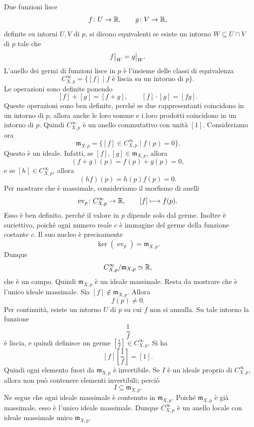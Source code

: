 \documentclass[a4paper]{article}
\begin{document}
\begin{snippetproof}{}
    Due funzioni lisce
    \[
        f\colon U\to\mathbb{R},
        \qquad
        g\colon V\to\mathbb{R},
    \]
    definite su intorni \(U,V\) di \(p\), si dicono equivalenti se esiste un intorno \(W\subseteq U\cap V\) di \(p\) tale che
    \[
        \restr{f}{W}=\restr{g}{W}.
    \]
    L'anello dei germi di funzioni lisce in \(p\) è l'insieme delle classi di equivalenza
    \[
        C^\infty_{X,p}
        =
        \{[f]\mid f \text{ è liscia su un intorno di }p\}.
    \]
    Le operazioni sono definite ponendo
    \[
        [f]+[g]=[f+g],
        \qquad
        [f]\cdot[g]=[fg].
    \]
    Queste operazioni sono ben definite, perché se due rappresentanti coincidono in un intorno di \(p\), allora anche le loro somme e i loro prodotti coincidono in un intorno di \(p\). Quindi \(C^\infty_{X,p}\) è un anello commutativo con unità \([1]\).
    Consideriamo ora
    \[
        \mathfrak{m}_{X,p}
        =
        \{[f]\in C^\infty_{X,p}\mid f(p)=0\}.
    \]
    Questo è un ideale. Infatti, se \([f],[g]\in\mathfrak{m}_{X,p}\), allora
    \[
        (f+g)(p)=f(p)+g(p)=0,
    \]
    e se \([h]\in C^\infty_{X,p}\), allora
    \[
        (hf)(p)=h(p)f(p)=0.
    \]
    Per mostrare che è massimale, consideriamo il morfismo di anelli
    \[
        \operatorname{ev}_p\colon C^\infty_{X,p}\to\mathbb{R},
        \qquad
        [f]\longmapsto f(p).
    \]
    Esso è ben definito, perché il valore in \(p\) dipende solo dal germe. Inoltre è suriettivo, poiché ogni numero reale \(c\) è immagine del germe della funzione costante \(c\). Il suo nucleo è precisamente
    \[
        \ker(\operatorname{ev}_p)=\mathfrak{m}_{X,p}.
    \]
    Dunque
    \[
        C^\infty_{X,p}/\mathfrak{m}_{X,p}\simeq\mathbb{R},
    \]
    che è un campo. Quindi \(\mathfrak{m}_{X,p}\) è un ideale massimale.
    Resta da mostrare che è l'unico ideale massimale. Sia \([f]\notin\mathfrak{m}_{X,p}\). Allora
    \[
        f(p)\neq0.
    \]
    Per continuità, esiste un intorno \(U\) di \(p\) su cui \(f\) non si annulla. Su tale intorno la funzione
    \[
        \frac1f
    \]
    è liscia, e quindi definisce un germe \(\left[\frac1f\right]\in C^\infty_{X,p}\). Si ha
    \[
        [f]\left[\frac1f\right]=[1].
    \]
    Quindi ogni elemento fuori da \(\mathfrak{m}_{X,p}\) è invertibile.
    Se \(I\) è un ideale proprio di \(C^\infty_{X,p}\), allora non può contenere elementi invertibili; perciò
    \[
        I\subseteq\mathfrak{m}_{X,p}.
    \]
    Ne segue che ogni ideale massimale è contenuto in \(\mathfrak{m}_{X,p}\). Poiché \(\mathfrak{m}_{X,p}\) è già massimale, esso è l'unico ideale massimale. Dunque \(C^\infty_{X,p}\) è un anello locale con ideale massimale unico \(\mathfrak{m}_{X,p}\).
\end{snippetproof}
\end{document}
